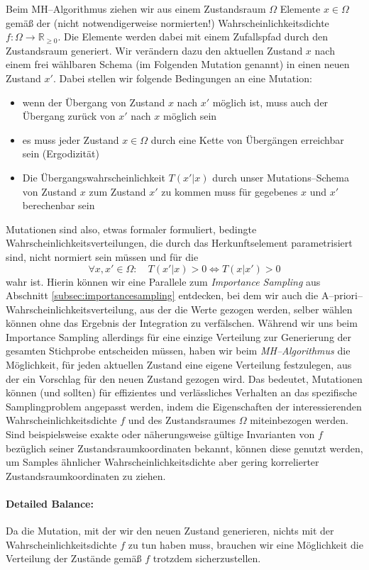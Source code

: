 	Beim MH--Algorithmus ziehen wir aus einem Zustandsraum $\Omega$ Elemente $x \in \Omega$ gemäß der (nicht notwendigerweise normierten!) Wahrscheinlichkeitsdichte $f : \Omega \rightarrow \mathbb{R}_{\geq 0}$. Die Elemente werden dabei mit einem Zufallspfad durch den Zustandsraum generiert. Wir verändern dazu den aktuellen Zustand $x$ nach einem frei wählbaren Schema (im Folgenden Mutation genannt) in einen neuen Zustand $x'$.
	Dabei stellen wir folgende Bedingungen an eine Mutation:
	\begin{itemize}
		\item{wenn der Übergang von Zustand $x$ nach $x'$ möglich ist, muss auch der Übergang zurück von $x'$ nach $x$ möglich sein}
		\item{es muss jeder Zustand $x \in \Omega$ durch eine Kette von Übergängen erreichbar sein (Ergodizität)}
		\item{Die Übergangswahrscheinlichkeit $T(x'|x)$ durch unser Mutations--Schema von Zustand $x$ zum Zustand $x'$ zu kommen muss für gegebenes $x$ und $x'$ berechenbar sein}
	\end{itemize}
	Mutationen sind also, etwas formaler formuliert, bedingte Wahrscheinlichkeitsverteilungen, die durch das Herkunftselement parametrisiert sind, nicht normiert sein müssen und für die
	$$\forall x,x'\in\Omega : \quad T(x'|x)>0 \Leftrightarrow T(x|x')>0$$
	wahr ist. Hierin können wir eine Parallele zum {\em Importance Sampling} aus Abschnitt \ref{subsec:importancesampling} entdecken, bei dem wir auch die A--priori--Wahr\-schein\-lich\-keits\-ver\-tei\-lung, aus der die Werte gezogen werden, selber wählen können ohne das Ergebnis der Integration zu verfälschen. Während wir uns beim Importance Sampling allerdings für eine einzige Verteilung zur Generierung der gesamten Stichprobe entscheiden müssen, haben wir beim {\em MH--Algorithmus} die Möglichkeit, für jeden aktuellen Zustand eine eigene Verteilung festzulegen, aus der ein Vorschlag für den neuen Zustand gezogen wird.
	Das bedeutet, Mutationen können (und sollten) für effizientes und verlässliches Verhalten an das spezifische Samplingproblem angepasst werden, indem die Eigenschaften der interessierenden Wahrscheinlichkeitsdichte $f$ und des Zustandsraumes $\Omega$ miteinbezogen werden. Sind beispielsweise exakte oder näherungsweise gültige Invarianten von $f$ bezüglich seiner Zustandsraumkoordinaten bekannt, können diese genutzt werden, um Samples ähnlicher Wahrscheinlichkeitsdichte aber gering korrelierter Zustandsraumkoordinaten zu ziehen.
	
		
	\paragraph{Detailed Balance:}
	Da die Mutation, mit der wir den neuen Zustand generieren, nichts mit der Wahrscheinlichkeitsdichte $f$ zu tun haben muss, brauchen wir eine Möglichkeit die Verteilung der Zustände gemäß $f$ trotzdem sicherzustellen.
	
